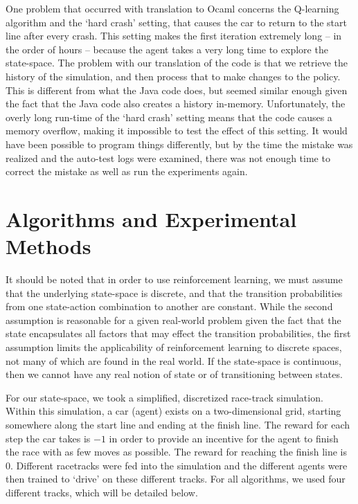 \documentclass[12pt, letterpaper]{article}
\begin{document}
One problem that occurred with translation to Ocaml concerns the Q-learning algorithm and the `hard crash' setting, that causes the car to return to the start line after every crash. This setting makes the first iteration extremely long -- in the order of hours -- because the agent takes a very long time to explore the state-space. The problem with our translation of the code is that we retrieve the history of the simulation, and then process that to make changes to the policy. This is different from what the Java code does, but seemed similar enough given the fact that the Java code also creates a history in-memory. Unfortunately, the overly long run-time of the `hard crash' setting means that the code causes a memory overflow, making it impossible to test the effect of this setting. It would have been possible to program things differently, but by the time the mistake was realized and the auto-test logs were examined, there was not enough time to correct the mistake as well as run the experiments again.

\section{Algorithms and Experimental Methods}
It should be noted that in order to use reinforcement learning, we must assume that the underlying state-space is discrete, and that the transition probabilities from one state-action combination to another are constant. While the second assumption is reasonable for a given real-world problem given the fact that the state encapsulates all factors that may effect the transition probabilities, the first assumption limits the applicability of reinforcement learning to discrete spaces, not many of which are found in the real world. If the state-space is continuous, then we cannot have any real notion of state or of transitioning between states.

For our state-space, we took a simplified, discretized race-track simulation. Within this simulation, a car (agent) exists on a two-dimensional grid, starting somewhere along the start line and ending at the finish line. The reward for each step the car takes is $-1$ in order to provide an incentive for the agent to finish the race with as few moves as possible. The reward for reaching the finish line is $0$. Different racetracks were fed into the simulation and the different agents were then trained to `drive' on these different tracks. For all algorithms, we used four different tracks, which will be detailed below.
\end{document}
